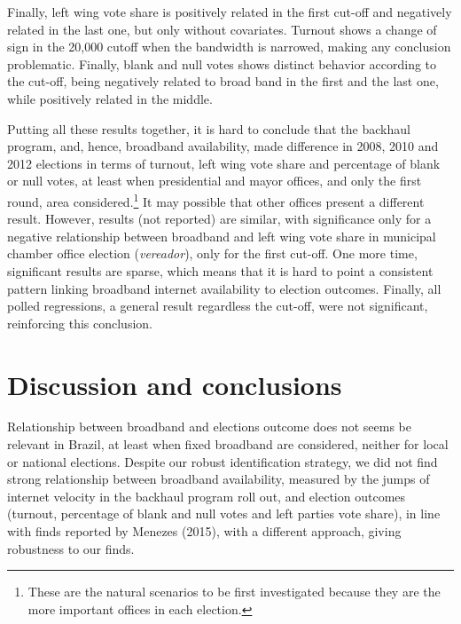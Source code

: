 \documentclass[
  12pt,
]{article}
\begin{document}
Finally, left wing vote share is positively related in the first cut-off
and negatively related in the last one, but only without covariates.
Turnout shows a change of sign in the 20,000 cutoff when the bandwidth
is narrowed, making any conclusion problematic. Finally, blank and null
votes shows distinct behavior according to the cut-off, being negatively
related to broad band in the first and the last one, while positively
related in the middle.

Putting all these results together, it is hard to conclude that the
backhaul program, and, hence, broadband availability, made difference in
2008, 2010 and 2012 elections in terms of turnout, left wing vote share
and percentage of blank or null votes, at least when presidential and
mayor offices, and only the first round, area considered.\footnote{These
  are the natural scenarios to be first investigated because they are
  the more important offices in each election.} It may possible that
other offices present a different result. However, results (not
reported) are similar, with significance only for a negative
relationship between broadband and left wing vote share in municipal
chamber office election (\emph{vereador}), only for the first cut-off.
One more time, significant results are sparse, which means that it is
hard to point a consistent pattern linking broadband internet
availability to election outcomes. Finally, all polled regressions, a
general result regardless the cut-off, were not significant, reinforcing
this conclusion.

\hypertarget{discussion-and-conclusions}{%
\section{Discussion and conclusions}\label{discussion-and-conclusions}}

Relationship between broadband and elections outcome does not seems be
relevant in Brazil, at least when fixed broadband are considered,
neither for local or national elections. Despite our robust
identification strategy, we did not find strong relationship between
broadband availability, measured by the jumps of internet velocity in
the backhaul program roll out, and election outcomes (turnout,
percentage of blank and null votes and left parties vote share), in line
with finds reported by Menezes (2015), with a different approach, giving
robustness to our finds.
\end{document}

